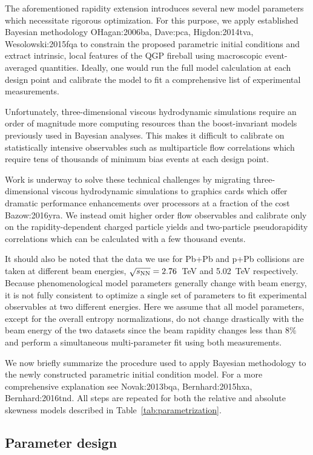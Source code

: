 The aforementioned rapidity extension introduces several new model parameters which necessitate rigorous optimization.
For this purpose, we apply established Bayesian methodology {OHagan:2006ba, Dave:pca, Higdon:2014tva, Wesolowski:2015fqa} to constrain the proposed parametric initial conditions and extract intrinsic, local features of the QGP fireball using macroscopic event-averaged quantities.
Ideally, one would run the full model calculation at each design point and calibrate the model to fit a comprehensive list of experimental measurements.

Unfortunately, three-dimensional viscous hydrodynamic simulations require an order of magnitude more computing resources than the boost-invariant models previously used in Bayesian analyses.
This makes it difficult to calibrate on statistically intensive observables such as multiparticle flow correlations which require tens of thousands of minimum bias events at each design point. 

Work is underway to solve these technical challenges by migrating three-dimensional viscous hydrodynamic simulations to graphics cards which offer dramatic performance enhancements over processors at a fraction of the cost {Bazow:2016yra}.
We instead omit higher order flow observables and calibrate only on the rapidity-dependent charged particle yields and two-particle pseudorapidity correlations which can be calculated with a few thousand events. 

It should also be noted that the data we use for Pb+Pb and p+Pb collisions are taken at different beam energies, ${\sqrt{s_\mathrm{NN}} = 2.76}$~TeV and 5.02~TeV respectively.
Because phenomenological model parameters generally change with beam energy, it is not fully consistent to optimize a single set of parameters to fit experimental observables at two different energies.
Here we assume that all model parameters, except for the overall entropy normalizations, do not change drastically with the beam energy of the two datasets since the beam rapidity changes less than $8\%$ and perform a simultaneous multi-parameter fit using both measurements.

We now briefly summarize the procedure used to apply Bayesian methodology to the newly constructed parametric initial condition model. For a more comprehensive explanation see {Novak:2013bqa, Bernhard:2015hxa, Bernhard:2016tnd}. All steps are repeated for both the relative and absolute skewness models described in Table~\ref{tab:parametrization}.

\subsection{Parameter design}

